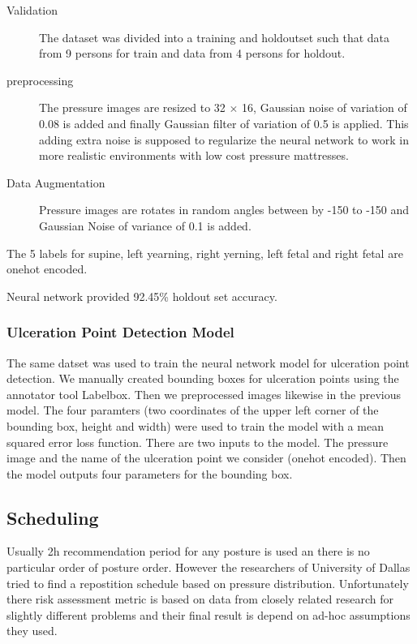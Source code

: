 \begin{description}
	\item[Validation] The dataset was divided into a training and holdoutset such that data from 9 persons for train and data from 4 persons for holdout.
	\item[preprocessing] The pressure images are resized to 32 $\times$ 16, Gaussian noise of variation of 0.08 is added and finally Gaussian filter of variation of 0.5 is applied. This adding extra noise is supposed to regularize the neural network to work in more realistic environments with low cost pressure mattresses.
	\item[Data Augmentation]  Pressure images are rotates in random angles between by -150 to -150 and Gaussian Noise of variance of 0.1 is added.	
\end{description}

The 5 labels for supine, left yearning, right yerning, left fetal and right fetal are onehot encoded. 

Neural network provided 92.45\% holdout set accuracy.


\subsubsection{Ulceration Point Detection Model}

The same datset was used to train the neural network model for ulceration point detection. We manually created bounding boxes for ulceration points using the annotator tool Labelbox\textsuperscript{\textregistered}. Then we preprocessed images likewise in the previous model.  The four paramters (two coordinates of the upper left corner of the bounding box, height and width) were used to train the model with a mean squared error loss function. There are two inputs to the model. The pressure image and the name of the ulceration point we consider (onehot encoded). Then the model outputs four parameters for the bounding box. 


\subsection{Scheduling}

Usually 2h recommendation period for any posture is used an there is no particular order of posture order. However the researchers of University of Dallas tried to find a repostition schedule based on pressure distribution. Unfortunately there risk assessment metric is based on data from closely related research for slightly different problems and their final result is depend on ad-hoc assumptions they used. 

